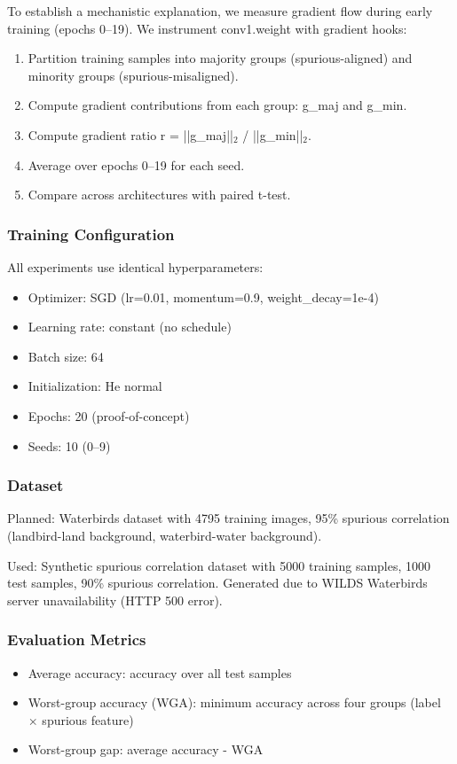 To establish a mechanistic explanation, we measure gradient flow during early training (epochs 0--19). We instrument conv1.weight with gradient hooks:

\begin{enumerate}
\item Partition training samples into majority groups (spurious-aligned) and minority groups (spurious-misaligned).
\item Compute gradient contributions from each group: g\_maj and g\_min.
\item Compute gradient ratio r = ||g\_maj||$_2$ / ||g\_min||$_2$.
\item Average over epochs 0--19 for each seed.
\item Compare across architectures with paired t-test.
\end{enumerate}

\subsubsection{Training Configuration}

All experiments use identical hyperparameters:
\begin{itemize}
\item Optimizer: SGD (lr=0.01, momentum=0.9, weight\_decay=1e-4)
\item Learning rate: constant (no schedule)
\item Batch size: 64
\item Initialization: He normal
\item Epochs: 20 (proof-of-concept)
\item Seeds: 10 (0--9)
\end{itemize}

\subsubsection{Dataset}

Planned: Waterbirds dataset \citep{Sagawa2020Distributionally} with 4795 training images, 95\% spurious correlation (landbird-land background, waterbird-water background).

Used: Synthetic spurious correlation dataset with 5000 training samples, 1000 test samples, 90\% spurious correlation. Generated due to WILDS Waterbirds server unavailability (HTTP 500 error).

\subsubsection{Evaluation Metrics}

\begin{itemize}
\item Average accuracy: accuracy over all test samples
\item Worst-group accuracy (WGA): minimum accuracy across four groups (label $\times$ spurious feature)
\item Worst-group gap: average accuracy - WGA
\end{itemize}
